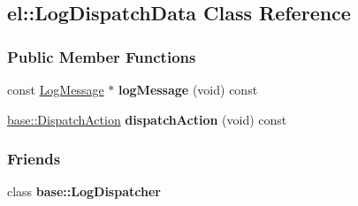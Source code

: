 \hypertarget{a00044}{}\subsection{el\+:\+:Log\+Dispatch\+Data Class Reference}
\label{a00044}
\subsubsection*{Public Member Functions}
\begin{DoxyCompactItemize}
\item 
\hypertarget{a00044_ad52d4ddc330b6260bf10e9879a653829}{}const \hyperlink{a00050}{Log\+Message} $\ast$ {\bfseries log\+Message} (void) const \label{a00044_ad52d4ddc330b6260bf10e9879a653829}

\item 
\hypertarget{a00044_aee0808c660aa39b34ee69850a2c74c09}{}\hyperlink{a00184_a3aa2563d38e47388ba242a1694fc2839}{base\+::\+Dispatch\+Action} {\bfseries dispatch\+Action} (void) const \label{a00044_aee0808c660aa39b34ee69850a2c74c09}

\end{DoxyCompactItemize}
\subsubsection*{Friends}
\begin{DoxyCompactItemize}
\item 
\hypertarget{a00044_a84d22f9ad5b796e49ff5f15a8c32773d}{}class {\bfseries base\+::\+Log\+Dispatcher}\label{a00044_a84d22f9ad5b796e49ff5f15a8c32773d}

\end{DoxyCompactItemize}
